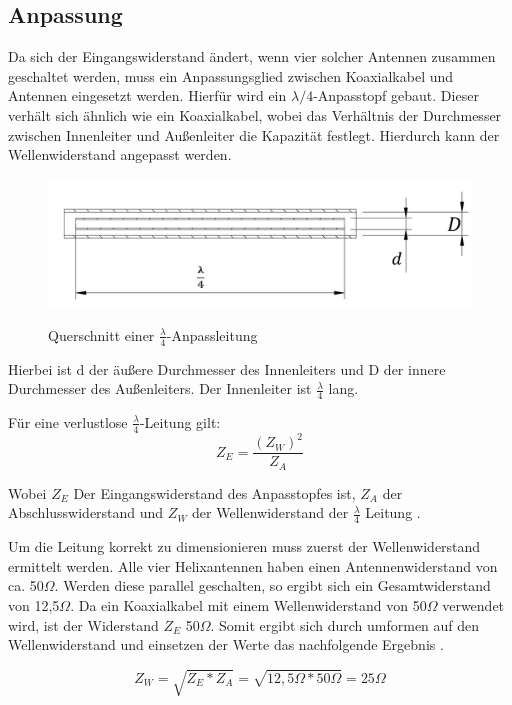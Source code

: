 \subsection{Anpassung}
Da sich der Eingangswiderstand ändert, wenn vier solcher Antennen zusammen geschaltet werden, muss ein Anpassungsglied zwischen Koaxialkabel und Antennen eingesetzt werden. Hierfür wird ein $\lambda/4$-Anpasstopf gebaut. Dieser verhält sich ähnlich wie ein Koaxialkabel, wobei das Verhältnis der Durchmesser zwischen Innenleiter und Außenleiter die Kapazität festlegt. Hierdurch kann der Wellenwiderstand angepasst werden.

\begin{figure}[H]
	\centering
	\includegraphics[width=\textwidth]{../ref/Prinzip-Anpasstopf.png}
	\label{fig:prinzip-anpasstopf}
	\caption{Querschnitt einer $\frac{\lambda}{4}$-Anpassleitung}
\end{figure}

Hierbei ist d der äußere Durchmesser des Innenleiters und D der innere Durchmesser des Außenleiters. Der Innenleiter ist $\frac{\lambda}{4}$ lang.

Für eine verlustlose $\frac{\lambda}{4}$-Leitung gilt:
\begin{equation}
	Z_E=\frac{(Z_W)^2}{Z_A}	
\end{equation}

Wobei $Z_E$ Der Eingangswiderstand des Anpasstopfes ist, $Z_A$ der Abschlusswiderstand und $Z_W$ der Wellenwiderstand der $\frac{\lambda}{4}$ Leitung \cite{admin_lambda4_2016}.

Um die Leitung korrekt zu dimensionieren muss zuerst der Wellenwiderstand ermittelt werden. Alle vier Helixantennen haben einen Antennenwiderstand von ca. 50$\Omega$. Werden diese parallel geschalten, so ergibt sich ein Gesamtwiderstand von 12,5$\Omega$. Da ein Koaxialkabel mit einem Wellenwiderstand von 50$\Omega$ verwendet wird, ist der Widerstand $Z_E$ 50$\Omega$. Somit ergibt sich durch umformen auf den Wellenwiderstand und einsetzen der Werte das nachfolgende Ergebnis \cite{admin_lambda4_2016}.

\begin{equation}
	Z_W=\sqrt{Z_E*Z_A}=\sqrt{12,5\Omega*50\Omega}=25\Omega
\end{equation}

